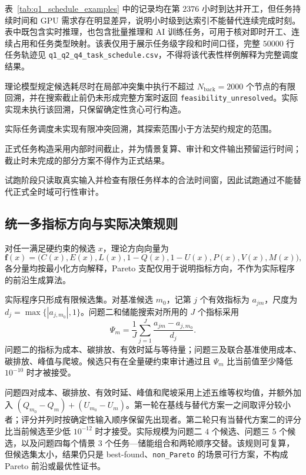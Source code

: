 \documentclass[withoutpreface,bwprint]{cumcmthesis}
\begin{document}
表~\ref{tab:q1_schedule_examples} 中的记录均在第 $2376$ 小时到达并开工，但任务持续时间和 GPU 需求存在明显差异，说明小时级到达索引不能替代连续完成时刻。表中既包含实时推理，也包含批量推理和 AI 训练任务，可用于核对即时开工、连续占用和任务类型映射。该表仅用于展示任务级字段和时间口径，完整 $50000$ 行任务轨迹见 \texttt{q1\_q2\_q4\_task\_schedule.csv}，不得将该代表性样例解释为完整调度结果。

理论模型规定候选耗尽时在局部冲突集中执行不超过 $N_{\mathrm{back}}=2000$ 个节点的有限回溯，并在搜索截止前仍未形成完整方案时返回 \texttt{feasibility\_unresolved}。实际实现未执行该回溯，只保留确定性贪心可行构造。

实际任务调度未实现有限冲突回溯，其探索范围小于方法契约规定的范围。

正式任务构造采用内部时间截止，并为情景复算、审计和文件输出预留运行时间；截止时未完成的部分方案不得作为正式结果。

试跑阶段只读取真实输入并检查有限任务样本的合法时间窗，因此试跑通过不能替代正式全时域可行性审计。


\subsection{统一多指标方向与实际决策规则}

对任一满足硬约束的候选 $x$，理论方向向量为
\begin{equation}
\mathbf f(x)=\bigl(C(x),E(x),L(x),1-Q(x),1-U(x),P(x),V(x),M(x)\bigr),
\end{equation}
各分量均按最小化方向解释，Pareto 支配仅用于说明指标方向，不作为实际程序的前沿生成算法。

实际程序只形成有限候选集。对基准候选 $m_0$，记第 $j$ 个有效指标为 $a_{jm}$，尺度为 $d_j=\max\{|a_{j,m_0}|,1\}$。问题二和储能搜索对所用的 $J$ 个指标采用
\begin{equation}
\Psi_m=\frac{1}{J}\sum_{j=1}^{J}\frac{a_{jm}-a_{j,m_0}}{d_j}.
\end{equation}
问题二的指标为成本、碳排放、有效时延与等待量；问题三及联合基准使用成本、碳排放、峰值与爬坡。候选只有在全量硬约束审计通过且 $\Psi_m$ 比当前值至少降低 $10^{-10}$ 时才被接受。

问题四对成本、碳排放、有效时延、峰值和爬坡采用上述五维等权均值，并额外加入 $(Q_{m_0}-Q_m)+(U_{m_0}-U_m)$。第一轮在基线与替代方案一之间取评分较小者；评分并列时按确定性输入顺序保留先出现者。第二轮只有当替代方案二的评分比当前候选至少低 $10^{-12}$ 时才接受。实际规模为问题二 $4$ 个候选、问题三 $5$ 个候选，以及问题四每个情景 $3$ 个任务—储能组合和两轮顺序交替。该规则可复算，但候选集太小，结果仍只是 best-found、\texttt{non\_Pareto} 的场景可行方案，不构成 Pareto 前沿或最优性证书。
\end{document}
